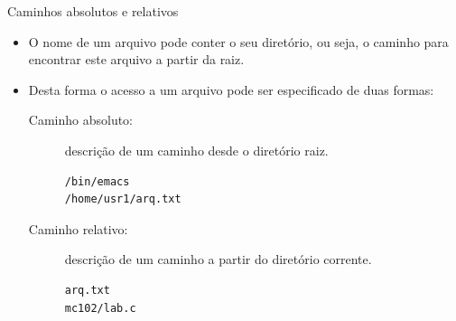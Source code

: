 \documentclass[handout]{beamer}
\begin{document}
\begin{frame}[fragile]{Caminhos absolutos e relativos}

    \begin{itemize}
        \item  O nome de um arquivo pode conter o seu diretório, ou seja, o caminho
        para encontrar este arquivo a partir da raiz.
        \item Desta forma  o acesso a um arquivo pode ser
        especificado de duas formas:

        \begin{block}{}
            \begin{description}
                \item[Caminho absoluto:] descrição de um caminho desde o diretório raiz.
\begin{verbatim}
/bin/emacs
/home/usr1/arq.txt
\end{verbatim}
                \item[Caminho relativo:] descrição de um caminho a partir  do diretório
                corrente.
\begin{verbatim}
arq.txt
mc102/lab.c
\end{verbatim}
            \end{description}
        \end{block}

    \end{itemize}

\end{frame}



\end{document}
